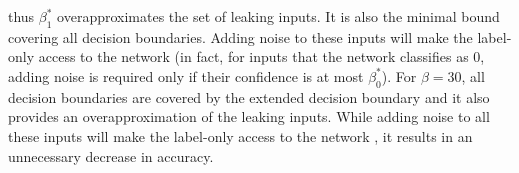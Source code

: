 thus $\beta^*_1$ overapproximates the set of leaking inputs.
It is also the minimal bound covering all decision boundaries. Adding noise to these inputs will make the label-only access to the network \propi (in fact, for inputs that the network classifies as $0$, adding noise is required only if their confidence is at most $\beta_0^*$). For $\beta=30$, all decision boundaries are covered by the extended decision boundary and it also provides an overapproximation of the leaking inputs. While adding noise to all these inputs will make the label-only access to the network \propi, it results in an unnecessary decrease in accuracy.
%
%
